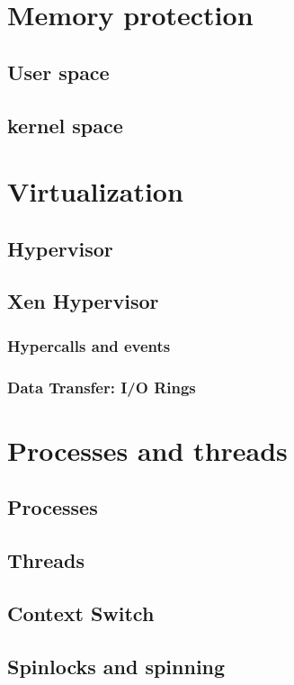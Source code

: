 
\section{Memory protection}

\subsection{User space}

\subsection{kernel space}

\section{Virtualization}

\subsection{Hypervisor}

\subsection{Xen Hypervisor}

\subsubsection{Hypercalls and events}

\subsubsection{Data Transfer: I/O Rings}

\section{Processes and threads}

\subsection{Processes}

\subsection{Threads}

\subsection{Context Switch}

\subsection{Spinlocks and spinning}

